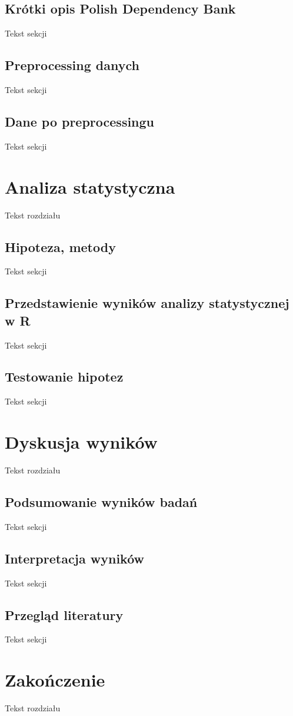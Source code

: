 \documentclass[licencjacka]{pracamgr}
\begin{document}
\section{Krótki opis Polish Dependency Bank}
Tekst sekcji
\section{Preprocessing danych}
Tekst sekcji
\section{Dane po preprocessingu}
Tekst sekcji

\chapter{Analiza statystyczna}
Tekst rozdziału
\section{Hipoteza, metody}
Tekst sekcji
\section{Przedstawienie wyników analizy statystycznej w R}
Tekst sekcji
\section{Testowanie hipotez}
Tekst sekcji

\chapter{Dyskusja wyników}
Tekst rozdziału
\section{Podsumowanie wyników badań}
Tekst sekcji
\section{Interpretacja wyników}
Tekst sekcji
\section{Przegląd literatury}
Tekst sekcji

\chapter{Zakończenie}
Tekst rozdziału
\end{document}
